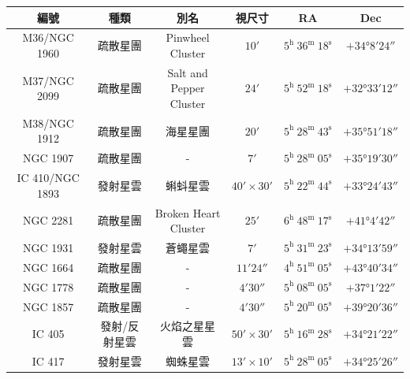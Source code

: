 \begin{center}
\begin{longtable}{c | c | c | c | c | c}
    編號 & 種類 & 別名 & 視尺寸 & RA & Dec \\
    \hline
    \endfirsthead


    \endfoot

    \endlastfoot

    M36/NGC 1960 & 疏散星團 & Pinwheel Cluster & \(\ang{;10;}\) & \(5^\text{h }36^\text{m }18^\text{s}\) & \(+\ang{34;8;24}\) \\
    M37/NGC 2099 & 疏散星團 & \makecell{Salt and Pepper\\Cluster} & \(\ang{;24;}\) & \(5^\text{h }52^\text{m }18^\text{s}\) & \(+\ang{32;33;12}\) \\
    M38/NGC 1912 & 疏散星團 &  海星星團 & \(\ang{;20;}\) & \(5^\text{h }28^\text{m }43^\text{s}\) & \(+\ang{35;51;18}\) \\
    NGC 1907 & 疏散星團 & - & \(\ang{;7;}\) & \(5^\text{h }28^\text{m }05^\text{s}\) & \(+\ang{35;19;30}\) \\
    IC 410/NGC 1893 & 發射星雲 & 蝌蚪星雲 & \(\ang{;40;}\times\ang{;30;}\) & \(5^\text{h }22^\text{m }44^\text{s}\) & \(+\ang{33;24;43}\) \\
    NGC 2281 & 疏散星團 & \makecell{Broken Heart\\Cluster} & \(\ang{;25;}\) & \(6^\text{h }48^\text{m }17^\text{s}\) & \(+\ang{41;4;42}\) \\
    NGC 1931 & 發射星雲 & 蒼蠅星雲 & \(\ang{;7;}\) & \(5^\text{h }31^\text{m }23^\text{s}\) & \(+\ang{34;13;59}\) \\
    NGC 1664 & 疏散星團 & - & \(\ang{;11;24}\) & \(4^\text{h }51^\text{m }05^\text{s}\) & \(+\ang{43;40;34}\) \\
    NGC 1778 & 疏散星團 & - & \(\ang{;4;30}\) & \(5^\text{h }08^\text{m }05^\text{s}\) & \(+\ang{37;1;22}\) \\
    NGC 1857 & 疏散星團 & - & \(\ang{;4;30}\) & \(5^\text{h }20^\text{m }05^\text{s}\) & \(+\ang{39;20;36}\) \\
    IC 405 & 發射/反射星雲 & 火焰之星星雲 & \(\ang{;50;}\times\ang{;30;}\) & \(5^\text{h }16^\text{m }28^\text{s}\) & \(+\ang{34;21;22}\) \\
    IC 417 & 發射星雲 & 蜘蛛星雲 & \(\ang{;13;}\times\ang{;10;}\) & \(5^\text{h }28^\text{m }05^\text{s}\) & \(+\ang{34;25;26}\)
\end{longtable}
\end{center}

